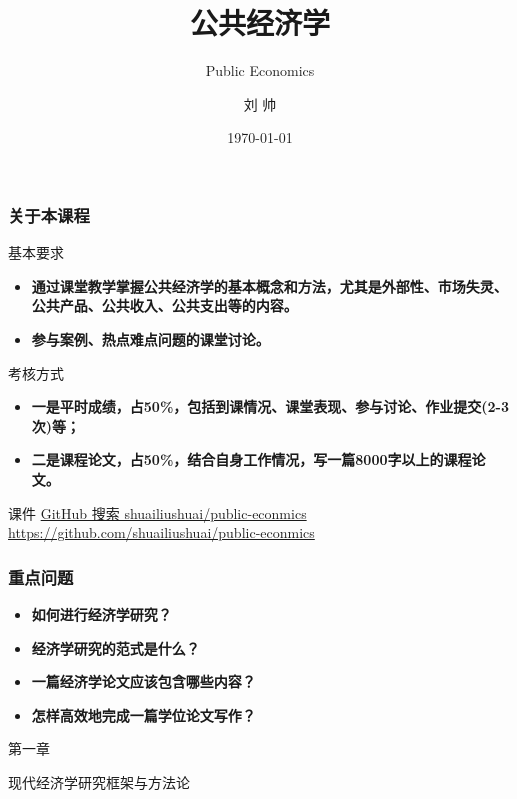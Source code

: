 \documentclass[aspectratio=169, 12pt]{beamer}
\title{公共经济学}
\subtitle{Public Economics}
\author[LIU ShHUAI]{刘 {  } 帅}
\institute{山西师范大学 {  } 经济与管理学院}
\date{\today}
\begin{document}
\maketitle

\begin{frame}[plain]
    \frametitle{关于本课程}
    \begin{block}{基本要求}
        \begin{itemize}
            \item \textbf{通过课堂教学掌握公共经济学的基本概念和方法，尤其是外部性、市场失灵、公共产品、公共收入、公共支出等的内容。}
            \item \textbf{参与案例、热点难点问题的课堂讨论。}
        \end{itemize}
    \end{block}
    \begin{block}{考核方式}
        \begin{itemize}
            \item \textbf{一是平时成绩，占50\%，包括到课情况、课堂表现、参与讨论、作业提交(2-3次)等；}
            \item \textbf{二是课程论文，占50\%，结合自身工作情况，写一篇8000字以上的课程论文。}
        \end{itemize}
    \end{block}
    \begin{block}{课件}
        \href{https://github.com/shuailiushuai/public-econmics}{GitHub 搜索 shuailiushuai/public-econmics}
        \url{https://github.com/shuailiushuai/public-econmics}
    \end{block}
\end{frame}

\begin{frame}[plain]
    \frametitle{重点问题}
    \begin{itemize}
        \item \textbf{如何进行经济学研究？}
        \item \textbf{经济学研究的范式是什么？}
        \item \textbf{一篇经济学论文应该包含哪些内容？}
        \item \textbf{怎样高效地完成一篇学位论文写作？}
    \end{itemize}
\end{frame}

\begin{frame}[standout]
    第一章\par
    \addtolength{\parskip}{.4em}
    现代经济学研究框架与方法论
\end{frame}
\end{document}
